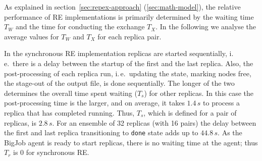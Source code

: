 \documentclass{rspublic}
\newcommand{\alnote}[1]{ {\textcolor{blue} { ***andre: #1 }}}
\newcommand{\athotanote}[1]{ {\textcolor{green} { ***athota: #1 }}}
\newcommand{\alnote}[1]{}
\newcommand{\athotanote}[1]{}
\begin{document}
As explained in section~\ref{sec:repex-approach}
(\ref{sec:math-model}), the relative performance of RE implementations
is primarily determined by the waiting time $T_W$ and the time for
conducting the exchange $T_X$. In the following we analyse the average
values for $T_{W}$ and $T_X$ for each replica pair.  

In the synchronous RE implementation replicas are started
sequentially, i.\,e.\ there is a delay between the startup of the
first and the last replica. Also, the post-processing of each replica
run, i.\,e.\ updating the state, marking nodes free, the stage-out of
the output file, is done sequentially. The longer of the two
determines the overall time spent waiting ($T_s$) for other replicas.
In this case the post-processing time is the larger, and on average,
it takes $1.4\,s$
to process a replica that has completed running. Thus, $T_{s}$, which is
defined for a pair of replicas, is $2.8\,s$. For an ensemble of 32
replicas (with 16 pairs) the delay between the first and last replica
transitioning to \texttt{done} state adds up to $44.8\,s$. As the
BigJob agent is ready to start replicas, there is no waiting time at
the agent; thus $T_r$ is 0 for synchronous RE.








\end{document}
